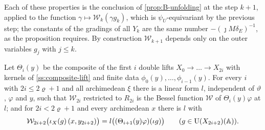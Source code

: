 Each of these properties is the conclusion of \cref{prop:B-unfolding} at the step $k+1$, applied to the function $\gamma\mapsto\mathcal W_k(\gamma g_k)$, which is $\psi_U$-equivariant by the previous step; the constants of the gradings of all $Y_k$ are the same number $-(\jmath M\delta_E)^{-1}$, as the proposition requires.
By construction $\mathcal W_{k+1}$ depends only on the outer variables $g_j$ with $j\le k$.

\begin{theorem}\label{thm:unfolded-upper}
Let $\Theta_i(y)$ be the composite of the first $i$ double lifts $X_0\to\dots\to X_{2i}$ with kernels of \cref{ss:composite-lift}
and finite data $\phi_0(y),\dots,\phi_{i-1}(y)$. For every $i$ with $2i\le2\varrho+1$ and all archimedean $\xi$ there is a linear
form $l$, independent of $\vartheta$, $\varphi$ and $y$, such that $\mathcal W_{2i}$ restricted to $R_{2i}$ is the Bessel function
$\mathcal W$ of $\Theta_i(y)\varphi$ at $l$; and for $2i<2\varrho+1$ and every archimedean $x$ there is $l$ with
\[
  \mathcal W_{2i+2}\bigl(\iota_X(g)\,(x,y_{2i+2})\bigr)=l\bigl((\Theta_{i+1}(y)\varphi)(\iota g)\bigr)\qquad(g\in\operatorname{U}(X_{2i+2})(\mathbb{A})).
\]
\end{theorem}

